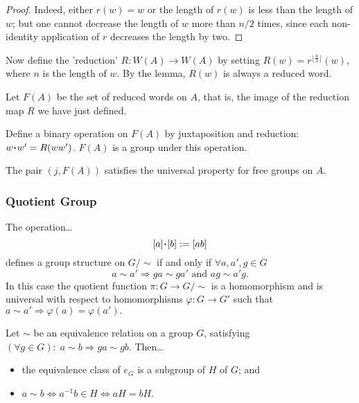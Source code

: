\begin{proof}
Indeed, either $r(w) = w$ or the length of $r(w)$ is less than the length of $w$; but one cannot decrease the length of $w$ more
than $n/2$ times, since each non-identity application of $r$ decreases the length by two.
\end{proof}

Now define the 'reduction' $R : W(A) \rightarrow W(A)$ by setting $R(w) = r^{\lfloor \frac{n}{2} \rfloor}(w)$, where $n$ is the length of $w$.
By the lemma, $R(w)$ is always a reduced word.

Let $F(A)$ be the set of reduced words on $A$, that is, the image of the reduction map $R$ we have just defined.

Define a binary operation on $F(A)$ by juxtaposition and reduction: $w \LargerCdot w' = R(ww')$. $F(A)$ is a group under this operation.

\begin{proposition}
The pair $(j, F(A))$ satisfies the universal property for free groups on $A$.
\end{proposition}

\subsubsection{Quotient Group}\label{groupquotients}

\label{quotientgroupbyrelation}
\begin{proposition}
The operation\dots
$$[a] \LargerCdot [b] := [ab]$$
defines a group structure on $G/\sim$ if and only if $\forall a, a', g \in G$
$$ a \sim a' \Rightarrow ga \sim ga' \textrm{ and } ag \sim a'g.$$
In this case the quotient function $\pi : G \rightarrow G/\sim$ is a homomorphism and is universal with respect to homomorphisms
$\varphi : G \rightarrow G'$ such that $a \sim a' \Rightarrow \varphi(a) = \varphi(a').$
\end{proposition}

\label{cosets}

\begin{proposition}
Let $\sim$ be an equivalence relation on a group $G$, satisfying $(\forall g \in G) : \; a \sim b \Rightarrow ga \sim gb$. Then\dots
\begin{itemize}
  \item the equivalence class of $e_G$ is a subgroup of $H$ of $G$; and
  \item $a \sim b \Leftrightarrow a^{-1}b \in H \Leftrightarrow aH = bH.$
\end{itemize}
\end{proposition}

